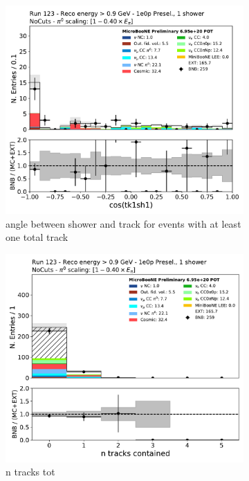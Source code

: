\begin{figure}[H]
    \centering
    \begin{subfigure}{0.3\textwidth}
    \includegraphics[width=1.0\textwidth]{1e0p/High_E_Sideband/tk1sh1_angle_alltk.pdf}
    \caption{angle between shower and track for events with at least one total track}
    \end{subfigure}
    \begin{subfigure}{0.3\textwidth}
    \includegraphics[width=1.0\textwidth]{1e0p/High_E_Sideband/n_tracks_tot.pdf}
    \caption{n tracks tot}
    \end{subfigure}
    \caption{} 
    \label{fig:1e0p:High_E_Sideband:datamc2}
\end{figure}

